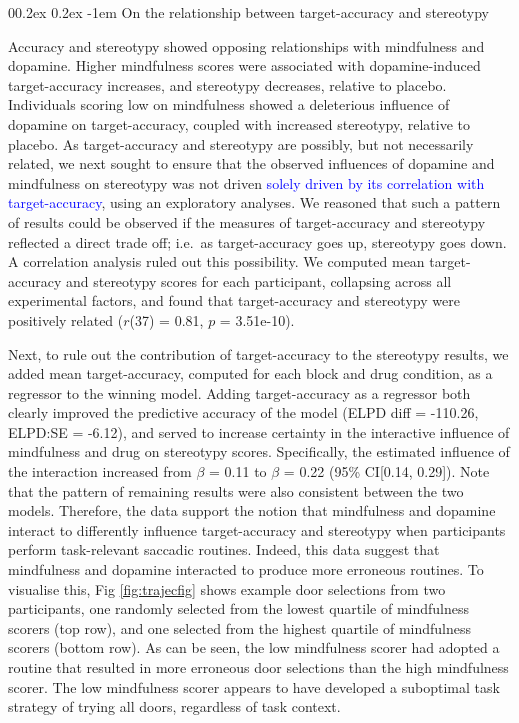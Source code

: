 \documentclass[
  man]{apa6}
\makeatletter
\let\oldparagraph\paragraph
\renewcommand{\paragraph}[1]{\oldparagraph{#1}\mbox{}}
\renewcommand{\paragraph}{\@startsection{paragraph}{4}{\parindent}%
  {0\baselineskip \@plus 0.2ex \@minus 0.2ex}%
  {-1em}%
  {\normalfont\normalsize\bfseries\itshape\typesectitle}}
\makeatother
\begin{document}
\hypertarget{on-the-relationship-between-target-accuracy-and-stereotypy}{%
\paragraph{On the relationship between target-accuracy and stereotypy}\label{on-the-relationship-between-target-accuracy-and-stereotypy}}

Accuracy and stereotypy showed opposing relationships with mindfulness and dopamine. Higher mindfulness scores were associated with dopamine-induced target-accuracy increases, and stereotypy decreases, relative to placebo. Individuals scoring low on mindfulness showed a deleterious influence of dopamine on target-accuracy, coupled with increased stereotypy, relative to placebo. As target-accuracy and stereotypy are possibly, but not necessarily related, we next sought to ensure that the observed influences of dopamine and mindfulness on stereotypy was not driven \textcolor{blue}{solely driven by its correlation with target-accuracy}, using an exploratory analyses. We reasoned that such a pattern of results could be observed if the measures of target-accuracy and stereotypy reflected a direct trade off; i.e.~as target-accuracy goes up, stereotypy goes down. A correlation analysis ruled out this possibility. We computed mean target-accuracy and stereotypy scores for each participant, collapsing across all experimental factors, and found that target-accuracy and stereotypy were positively related (\(r\)(37) = 0.81, \(p\) = 3.51e-10).

Next, to rule out the contribution of target-accuracy to the stereotypy results, we added mean target-accuracy, computed for each block and drug condition, as a regressor to the winning model. Adding target-accuracy as a regressor both clearly improved the predictive accuracy of the model (ELPD diff = -110.26, ELPD:SE = -6.12), and served to increase certainty in the interactive influence of mindfulness and drug on stereotypy scores. Specifically, the estimated influence of the interaction increased from \(\beta\) = 0.11 to \(\beta\) = 0.22 (95\% CI{[}0.14, 0.29{]}). Note that the pattern of remaining results were also consistent between the two models. Therefore, the data support the notion that mindfulness and dopamine interact to differently influence target-accuracy and stereotypy when participants perform task-relevant saccadic routines. Indeed, this data suggest that mindfulness and dopamine interacted to produce more erroneous routines. To visualise this, Fig \ref{fig:trajecfig} shows example door selections from two participants, one randomly selected from the lowest quartile of mindfulness scorers (top row), and one selected from the highest quartile of mindfulness scorers (bottom row). As can be seen, the low mindfulness scorer had adopted a routine that resulted in more erroneous door selections than the high mindfulness scorer. The low mindfulness scorer appears to have developed a suboptimal task strategy of trying all doors, regardless of task context.
\end{document}
